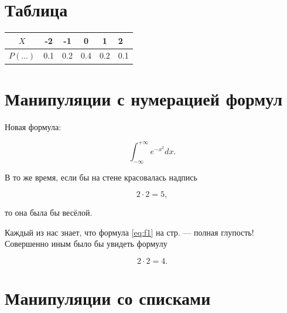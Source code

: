 \documentclass[12pt, a4paper]{article}  %
\begin{document}
\section{Таблица} 

\begin{tabular}{|c|c|c|cc|p{6cm}|}
	\hline
	$X$ & -2 & -1 & 0 & 1 & 2 \\
	\hline
	$P(\ldots)$ & 0.1 & 0.2 & 0.4 & 0.2 & 0.1 \\
\end{tabular}





\newpage  %

\section{Манипуляции с нумерацией формул} 

Новая формула: 

\begin{equation}
\int_{-\infty}^{+\infty} e^{-x^2} dx.
\end{equation}

В то же время, если бы на стене красовалась надпись

\begin{equation}\label{eq:f1}
2 \cdot 2 = 5,
\end{equation}

то она была бы весёлой.

Каждый из нас знает, что формула \eqref{eq:f1}  на стр. \pageref{eq:f1} --- полная глупость! Совершенно иным было бы увидеть формулу

\begin{equation}
2 \cdot 2 = 4.
\end{equation}


\section{Манипуляции со списками} 
\end{document}
